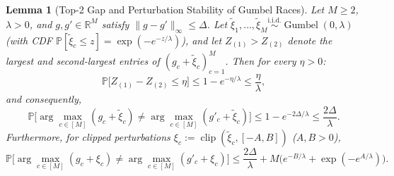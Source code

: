 \documentclass[11pt]{article}
\newtheorem{lemma}{Lemma}
\theoremstyle{definition}
\newcommand{\R}{\mathbb{R}}
\newcommand{\Prob}{\mathbb{P}}
\newcommand{\Gumbel}{\operatorname{Gumbel}}
\newcommand{\clip}{\operatorname{clip}}
\begin{document}
\begin{lemma}[Top-2 Gap and Perturbation Stability of Gumbel Races]
\label{lem:gumbel}
Let $M \ge 2$, $\lambda > 0$, and $g, g' \in \R^M$ satisfy $\|g - g'\|_\infty \le \Delta$. Let $\tilde{\xi}_1, \dots, \tilde{\xi}_M \stackrel{\text{i.i.d.}}{\sim} \Gumbel(0, \lambda)$ (with CDF $\Prob[\tilde{\xi}_c \le z] = \exp(-e^{-z/\lambda})$), and let $Z_{(1)} > Z_{(2)}$ denote the largest and second-largest entries of $(g_c + \tilde{\xi}_c)_{c=1}^M$. Then for every $\eta > 0$:
\[
    \Prob\big[Z_{(1)} - Z_{(2)} \le \eta\big] \le 1 - e^{-\eta/\lambda} \le \frac{\eta}{\lambda},
\]
and consequently,
\[
    \Prob\Big[\arg\max_{c \in [M]} (g_c + \tilde{\xi}_c) \ne \arg\max_{c \in [M]} (g'_c + \tilde{\xi}_c)\Big] \le 1 - e^{-2\Delta/\lambda} \le \frac{2\Delta}{\lambda}.
\]
Furthermore, for clipped perturbations $\xi_c := \clip(\tilde{\xi}_c, [-A, B])$ ($A, B > 0$),
\[
    \Prob\Big[\arg\max_{c \in [M]} (g_c + \xi_c) \ne \arg\max_{c \in [M]} (g'_c + \xi_c)\Big] \le \frac{2\Delta}{\lambda} + M\Big(e^{-B/\lambda} + \exp(-e^{A/\lambda})\Big).
\]
\end{lemma}
\end{document}

